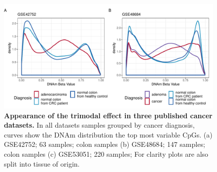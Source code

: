 \documentclass[a4paper]{article}
\begin{document}
\begin{figure}
\includegraphics[width=1\textwidth]{../../figs/cancer_public_same_variable_cpg_num.pdf}
\caption{\textbf{Appearance of the trimodal effect in three published cancer datasets.} In all datasets samples grouped by cancer diagnosis, curves show the DNAm distribution the top most variable CpGs. (a) GSE42752; 63 samples; colon samples (b) GSE48684; 147 samples; colon samples (c) GSE53051; 220 samples; For clarity plots are also split into tissue of origin. }
\end{figure}
\end{document}
